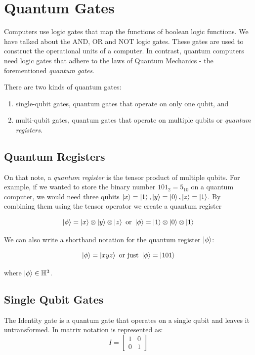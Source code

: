 \section{Quantum Gates}

Computers use logic gates that map the functions of boolean logic functions. We have talked about
the AND, OR and NOT logic gates. These gates are used to construct the operational units of a
 computer. In contrast, quantum computers need logic gates that adhere to the
laws of Quantum Mechanics - the forementioned \textit{quantum gates}.

There are two kinds of quantum gates:
\begin{enumerate}
    \item single-qubit gates, quantum gates that operate on only one qubit, and
    \item multi-qubit gates, quantum gates that operate on multiple qubits or \textit{quantum registers}.
\end{enumerate}

\subsection{Quantum Registers}

On that note, a \textit{quantum register} is the tensor product of multiple qubits. For example,
if we wanted to store the binary number $101_2=5_{10}$ on a quantum computer, we would need three
qubits $\ket{x}=\ket{1},\ket{y}=\ket{0},\ket{z}=\ket{1}$. By combining them using the tensor operator
we create a quantum register

\begin{equation}
    \ket{\phi}=\ket{x}\otimes\ket{y}\otimes\ket{z}\text{ or }\ket{\phi}=\ket{1}\otimes\ket{0}\otimes\ket{1}
\end{equation}

We can also write a shorthand notation for the quantum register $\ket{\phi}$:

\begin{equation}
    \ket{\phi}=\ket{xyz}\text{ or just }\ket{\phi}=\ket{101}
\end{equation}

where $\ket{\phi}\in\mathbb{H}^3$.

\subsection{Single Qubit Gates}

The Identity gate is a quantum gate that operates on a single qubit and leaves it untransformed.
In matrix notation is represented as:
\begin{equation}
    I = \begin{bmatrix}
        1 & 0 \\
        0 & 1
    \end{bmatrix}
\end{equation}

